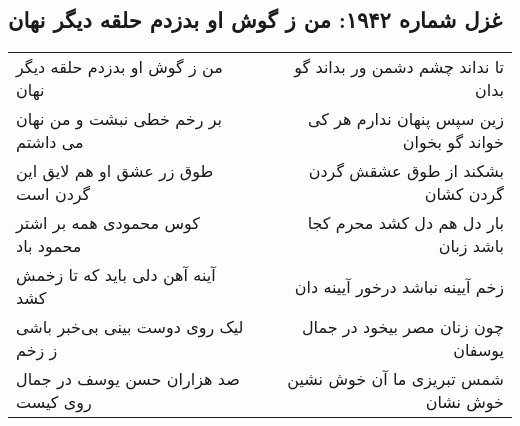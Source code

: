 \begin{center}
\section*{غزل شماره ۱۹۴۲: من ز گوش او بدزدم حلقه دیگر نهان}
\label{sec:1942}
\begin{longtable}{l p{0.5cm} r}
من ز گوش او بدزدم حلقه دیگر نهان
&&
تا نداند چشم دشمن ور بداند گو بدان
\\
بر رخم خطی نبشت و من نهان می داشتم
&&
زین سپس پنهان ندارم هر کی خواند گو بخوان
\\
طوق زر عشق او هم لایق این گردن است
&&
بشکند از طوق عشقش گردن گردن کشان
\\
کوس محمودی همه بر اشتر محمود باد
&&
بار دل هم دل کشد محرم کجا باشد زبان
\\
آینه آهن دلی باید که تا زخمش کشد
&&
زخم آیینه نباشد درخور آیینه دان
\\
لیک روی دوست بینی بی‌خبر باشی ز زخم
&&
چون زنان مصر بیخود در جمال یوسفان
\\
صد هزاران حسن یوسف در جمال روی کیست
&&
شمس تبریزی ما آن خوش نشین خوش نشان
\\
\end{longtable}
\end{center}
